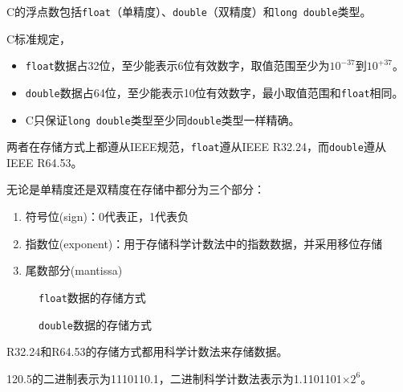 \begin{frame}
C的浮点数包括\lstinline|float|（单精度）、\lstinline|double|（双精度）和\lstinline|long double|类型。 
\end{frame}
%
%
\begin{frame}

C标准规定，
\begin{itemize}
\item \lstinline|float|数据占32位，至少能表示6位有效数字，取值范围至少为$10^{-37}$到$10^{+37}$。
\item \lstinline|double|数据占64位，至少能表示10位有效数字，最小取值范围和\lstinline|float|相同。
\item C只保证\lstinline|long double|类型至少同\lstinline|double|类型一样精确。
\end{itemize}
\vspace{0.1in}

两者在存储方式上都遵从IEEE规范，\lstinline|float|遵从IEEE R32.24，而\lstinline|double|遵从IEEE R64.53。
\end{frame}
%
\begin{frame}
无论是单精度还是双精度在存储中都分为三个部分：

\begin{enumerate}
\item
符号位(sign)：0代表正，1代表负\\[0.1in]
\item 
指数位(exponent)：用于存储科学计数法中的指数数据，并采用移位存储\\[0.1in]
\item 
尾数部分(mantissa)
\end{enumerate}
\end{frame}
\begin{frame}
\begin{figure}
\centering

\caption{\lstinline|float|数据的存储方式}
\end{figure}
\end{frame}
%
\begin{frame}
\begin{figure}
\centering

\caption{\lstinline|double|数据的存储方式}
\end{figure}
\end{frame}
%
\begin{frame}
R32.24和R64.53的存储方式都用科学计数法来存储数据。

\begin{li}
120.5的二进制表示为1110110.1，二进制科学计数法表示为1.1101101$\times 2^6$。
\end{li}

\end{frame}
